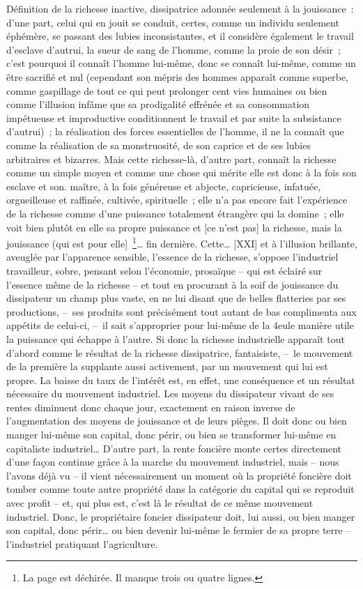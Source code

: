 \documentclass[french,twoside]{book} %
\begin{document}
Définition de la richesse inactive, dissipatrice adonnée seulement à la jouissance : d’une part, celui qui en jouit se conduit, certes, comme un individu seulement éphémère, se passant des lubies inconsistantes, et il considère également le travail d’esclave d’autrui, la sueur de sang de l’homme, comme la proie de son désir ; c’est pourquoi il connaît l’homme lui-même, donc se connaît lui-même, comme un être sacrifié et nul (cependant son mépris des hommes apparaît comme superbe, comme gaspillage de tout ce qui peut prolonger cent vies humaines ou bien comme l’illusion infâme que sa prodigalité effrénée et sa consommation impétueuse et improductive conditionnent le travail et par suite la subsistance d’autrui) ; la réalisation des forces essentielles de l’homme, il ne la connaît que comme la réalisation de sa monstruosité, de son caprice et de ses lubies arbitraires et bizarres. Mais cette richesse-là, d’autre part, connaît la richesse comme un simple moyen et comme une chose qui mérite elle est donc à la fois son esclave et son. maître, à la fois généreuse et abjecte, capricieuse, infatuée, orgueilleuse et raffinée, cultivée, spirituelle ; elle n’a pas encore fait l’expérience de la richesse comme d’une puissance totalement étrangère qui la domine ; elle voit bien plutôt en elle sa propre puissance et [ce n’est pas] la richesse, mais la jouissance (qui est pour elle] \footnote{La page est déchirée. Il manque trois ou quatre lignes.}… fin dernière. Cette… [XXI] et à l’illusion brillante, aveuglée par l’apparence sensible, l’essence de la richesse, s’oppose l’industriel travailleur, sobre, pensant selon l’économie, prosaïque – qui est éclairé sur l’essence même de la richesse – et tout en procurant à la soif de jouissance du dissipateur un champ plus vaste, en ne lui disant que de belles flatteries par ses productions, – ses produits sont précisément tout autant de bas complimenta aux appétits de celui-ci, – il sait s’approprier pour lui-même de la 4eule manière utile la puissance qui échappe à l’autre. Si donc la richesse industrielle apparaît tout d’abord comme le résultat de la richesse dissipatrice, fantaisiste, – le mouvement de la première la supplante aussi activement, par un mouvement qui lui est propre. La baisse du taux de l’intérêt est, en effet, une conséquence et un résultat nécessaire du mouvement industriel. Les moyens du dissipateur vivant de ses rentes diminuent donc chaque jour, exactement en raison inverse de l’augmentation des moyens de jouissance et de leurs pièges. Il doit donc ou bien manger lui-même son capital, donc périr, ou bien se transformer lui-même en capitaliste industriel… D’autre part, la rente foncière monte certes directement d’une façon continue grâce à la marche du mouvement industriel, mais – nous l’avons déjà vu – il vient nécessairement un moment où la propriété foncière doit tomber comme toute autre propriété dans la catégorie du capital qui se reproduit avec profit – et, qui plus est, c’est là le résultat de ce même mouvement industriel. Donc, le propriétaire foncier dissipateur doit, lui aussi, ou bien manger son capital, donc périr… ou bien devenir lui-même le fermier de sa propre terre – l’industriel pratiquant l’agriculture.\par
\end{document}
